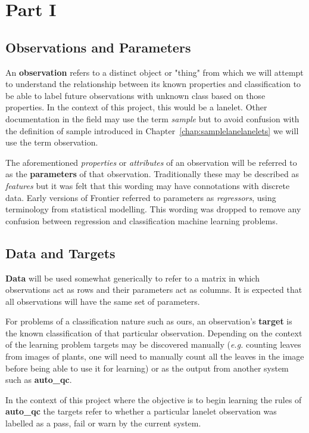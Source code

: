 \section{Part I}
\label{app:concepts-p1}
\subsection{Observations and Parameters}

An \textbf{observation} refers to a distinct object or "thing" from which we
will attempt to understand the relationship between its known properties and
classification to be able to label future observations with unknown class based
on those properties. In the context of this project, this would be a lanelet.
Other documentation in the field may use the term \textit{sample} but to avoid
confusion with the definition of sample introduced in
Chapter~\ref{chap:samplelanelanelets} we will use the term observation.

The aforementioned \textit{properties} or \textit{attributes} of an observation
will be referred to as the \textbf{parameters} of that observation.
Traditionally these may be described as \textit{features} but it was felt that
this wording may have connotations with discrete data. Early versions of
Frontier referred to parameters as \textit{regressors}, using terminology from
statistical modelling. This wording was dropped to remove any confusion between
regression and classification machine learning problems.


\subsection{Data and Targets}

\textbf{Data} will be used somewhat generically to refer to a matrix in which
observations act as rows and their parameters act as columns. It is expected
that all observations will have the same set of parameters.

For problems of a classification nature such as ours, an observation's
\textbf{target} is the known classification of that particular observation.
Depending on the context of the learning problem targets may be discovered
manually (\textit{e.g.} counting leaves from images of plants, one will need to
manually count all the leaves in the image before being able to use it for
learning) or as the output from another system such as \textbf{auto\_qc}.

In the context of this project where the objective is to begin learning the
rules of \textbf{auto\_qc} the targets refer to whether a particular lanelet
observation was labelled as a pass, fail or warn by the current system.


